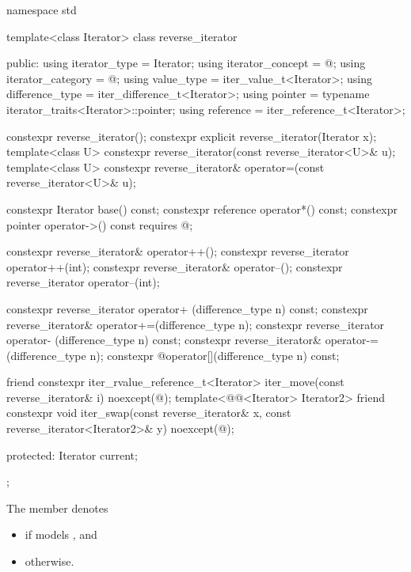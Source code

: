 %
\begin{codeblock}
namespace std {
  template<class Iterator>
  class reverse_iterator {
  public:
    using iterator_type     = Iterator;
    using iterator_concept  = @\seebelow@;
    using iterator_category = @\seebelow@;
    using value_type        = iter_value_t<Iterator>;
    using difference_type   = iter_difference_t<Iterator>;
    using pointer           = typename iterator_traits<Iterator>::pointer;
    using reference         = iter_reference_t<Iterator>;

    constexpr reverse_iterator();
    constexpr explicit reverse_iterator(Iterator x);
    template<class U> constexpr reverse_iterator(const reverse_iterator<U>& u);
    template<class U> constexpr reverse_iterator& operator=(const reverse_iterator<U>& u);

    constexpr Iterator base() const;
    constexpr reference operator*() const;
    constexpr pointer   operator->() const requires @\seebelow@;

    constexpr reverse_iterator& operator++();
    constexpr reverse_iterator  operator++(int);
    constexpr reverse_iterator& operator--();
    constexpr reverse_iterator  operator--(int);

    constexpr reverse_iterator  operator+ (difference_type n) const;
    constexpr reverse_iterator& operator+=(difference_type n);
    constexpr reverse_iterator  operator- (difference_type n) const;
    constexpr reverse_iterator& operator-=(difference_type n);
    constexpr @\unspec@ operator[](difference_type n) const;

    friend constexpr iter_rvalue_reference_t<Iterator>
      iter_move(const reverse_iterator& i) noexcept(@\seebelow@);
    template<@@<Iterator> Iterator2>
      friend constexpr void
        iter_swap(const reverse_iterator& x,
                  const reverse_iterator<Iterator2>& y) noexcept(@\seebelow@);

  protected:
    Iterator current;
  };
}
\end{codeblock}

\pnum
The member   denotes
\begin{itemize}
\item
{} if  models
, and
\item
{} otherwise.
\end{itemize}

